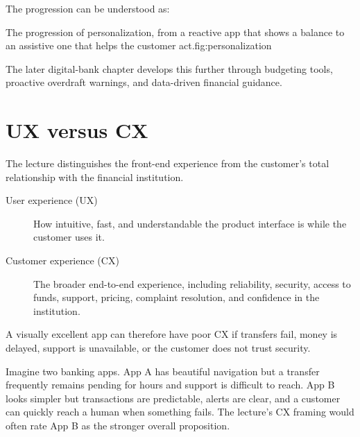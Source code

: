 The progression can be understood as:

\begin{utpfig}{The progression of personalization, from a reactive app that shows a balance to an assistive one that helps the customer act.}{fig:personalization}
\end{utpfig}

The later digital-bank chapter develops this further through budgeting tools, proactive overdraft warnings, and data-driven financial guidance.

\section{UX versus CX}

The lecture distinguishes the front-end experience from the customer's total relationship with the financial institution.

\begin{description}
  \item[User experience (UX)] How intuitive, fast, and understandable the product interface is while the customer uses it.
  \item[Customer experience (CX)] The broader end-to-end experience, including reliability, security, access to funds, support, pricing, complaint resolution, and confidence in the institution.
\end{description}

A visually excellent app can therefore have poor CX if transfers fail, money is delayed, support is unavailable, or the customer does not trust security.

\begin{workedexample}
Imagine two banking apps. App A has beautiful navigation but a transfer frequently remains pending for hours and support is difficult to reach. App B looks simpler but transactions are predictable, alerts are clear, and a customer can quickly reach a human when something fails. The lecture's CX framing would often rate App B as the stronger overall proposition.
\end{workedexample}

